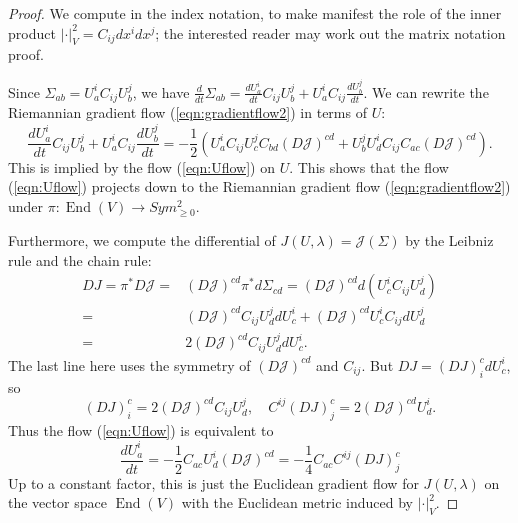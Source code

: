 \documentclass[a4paper]{article}
\theoremstyle{definition}
\newcommand{\1}{\mathbbm{1}}
\DeclareMathOperator{\End}{End}
\begin{document}
	
	\begin{proof}
		We compute in the index notation, to make manifest the role of the inner product $|\cdot|^2_V= C_{ij}dx^idx^j$; the interested reader may work out the matrix notation proof.
		
		
		
		Since $\Sigma_{ab}= U_a^i C_{ij} U_b^j$, we have $\frac{d}{dt}\Sigma_{ab}= \frac{d U_a^i}{dt} C_{ij} U_b^j+ U^i_a C_{ij} \frac{dU_b^j}{dt}$. We can rewrite the Riemannian gradient flow (\ref{eqn:gradientflow2}) in terms of $U$:
		\[
		\frac{d U_a^i}{dt} C_{ij} U_b^j+ U^i_a C_{ij} \frac{dU_b^j}{dt}= - \frac{1}{2} (U_a^i C_{ij} U_c^j C_{bd} (D \mathcal{J})^{cd}   + U_b^j U_d^i C_{ij} C_{ac}  (D \mathcal{J})^{cd}    ).
		\]
		This is implied by the flow (\ref{eqn:Uflow}) on $U$. This shows that the flow (\ref{eqn:Uflow}) projects down to the Riemannian gradient flow (\ref{eqn:gradientflow2}) under $\pi: \End(V)\to Sym^2_{\geq 0}$. 
		
		
		
		
		Furthermore,  we compute the differential of $J(U,\lambda)= \mathcal{J}(\Sigma)$ by the Leibniz rule and the chain rule:
		\[
		\begin{split}
			DJ= \pi^* D\mathcal{J}= & (D\mathcal{J})^{cd} \pi^* d\Sigma_{cd} = (D\mathcal{J})^{cd} d( U_c^i C_{ij} U_d^j  )
			\\
			= &   (D\mathcal{J})^{cd} C_{ij} U_d^j  dU_c^i  + (D\mathcal{J})^{cd} U_c^i C_{ij} dU_d^j 
			\\
			= &  2(D\mathcal{J})^{cd} C_{ij} U_d^j  dU_c^i  .
		\end{split}
		\]
		The last line here uses the symmetry of $(D\mathcal{J})^{cd}$ and $C_{ij}$. But $DJ= (DJ)_i^c dU_c^i$, so
		\[
		(DJ)_i^c = 2(D\mathcal{J})^{cd} C_{ij} U_d^j  ,\quad    C^{ij}(DJ)^c_j= 2(D\mathcal{J})^{cd} U_d^i. 
		\]
		Thus the flow (\ref{eqn:Uflow}) is equivalent to
		\[
		\frac{dU_a^i}{dt}= - \frac{1}{2} C_{ac} U_d^i (D\mathcal{J})^{cd}= - \frac{1}{4} C_{ac} C^{ij} (DJ)^c_j
		\]
		Up to a constant factor, this is just the Euclidean gradient flow for $J(U,\lambda)$ on the vector space $\End(V)$ with the Euclidean metric induced by $|\cdot|_V^2$.
	\end{proof}
	
	
	
	
	
	
	
\end{document}
